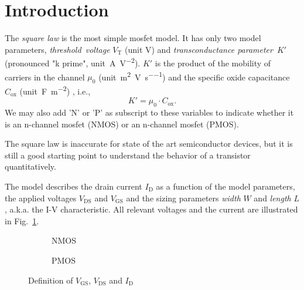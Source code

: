 \documentclass{article}[11pt]
\begin{document}
\notetitle

\section{Introduction}

The \textit{square law} is the most simple \gls{mosfet} model.
It has only two model parameters,
\textit{threshold~voltage} $V_{\mathrm{T}}$ (unit \si{\volt})%
and \textit{transconductance parameter}~$K'$ 
(pronounced "k prime", unit~\si{\ampere\per\volt\squared}).
$K'$ is the product of the mobility of carriers in the channel $\mu_0$ 
(unit~\si{\meter\squared\per\volt\per\second}) and the 
specific oxide capacitance $C_{\mathrm{ox}}$ 
(unit~\si{\farad\per\meter\squared}) \cite{allen-cmosancirdes-12}, i.e.,
\begin{equation}
K' = \mu_0 \cdot C_{\mathrm{ox}}.
\end{equation}
We may also add 'N' or 'P' as subscript to these variables to indicate whether 
it is an n-channel \gls{mosfet} (NMOS) or an n-channel \gls{mosfet} (PMOS).

The square law is inaccurate for state of the art semiconductor devices, 
but it is still a good starting point to understand the behavior of 
a transistor quantitatively.

\medskip

The model describes the drain current $I_{\mathrm{D}}$ as
a function of the model parameters, the applied voltages
$V_{\mathrm{DS}}$ and $V_{\mathrm{GS}}$ and the sizing
parameters \textit{width} $W$ and \textit{length} $L$, 
a.k.a. the I-V characteristic.
All relevant voltages and the current are illustrated in 
Fig.~\ref{fig:squarelawschematic}.

\begin{figure}[H]
  \centering
    \begin{subfigure}[b]{0.475\textwidth}
        \centering
        \begin{circuitikz}[scale=1.2]
          
        \end{circuitikz}
        \caption{NMOS}
    \end{subfigure}%
    \hfill
    \begin{subfigure}[b]{0.475\textwidth}
        \centering
        \begin{circuitikz}[scale=1.2]
          
        \end{circuitikz}
        \caption{PMOS}
    \end{subfigure}
  \caption{Definition of $V_{\mathrm{GS}}$, $V_{\mathrm{DS}}$ and $I_{\mathrm{D}}$}
  \label{fig:squarelawschematic}
\end{figure}
\end{document}
